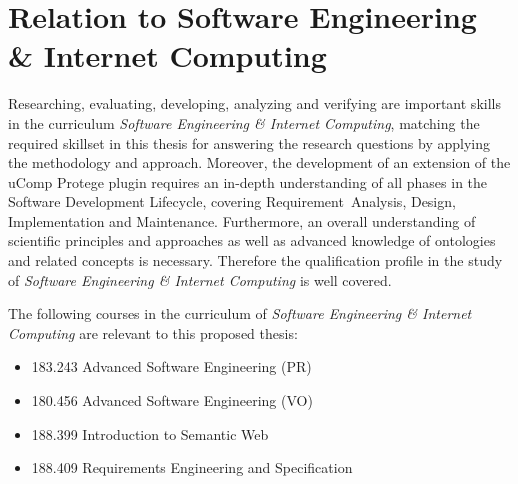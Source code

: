 \documentclass[12pt, notitlepage]{article}
\begin{document}
\section{Relation to Software Engineering \& Internet Computing}
Researching, evaluating, developing, analyzing and verifying are important skills in the curriculum \emph{Software Engineering \& Internet Computing}, matching the required skillset in this thesis for answering the research questions by applying the methodology and approach. Moreover, the development of an extension of the uComp Protege plugin requires an in-depth understanding of all phases in the Software Development Lifecycle, covering Requirement~Analysis, Design, Implementation and Maintenance. Furthermore, an overall understanding of scientific principles and approaches as well as advanced knowledge of ontologies and related concepts is necessary. Therefore the qualification profile in the study of \emph{Software Engineering \& Internet Computing} is well covered. 

The following courses in the curriculum of \emph{Software Engineering \& Internet Computing} are relevant to this proposed thesis:
\begin{itemize}
	\item 183.243 Advanced Software Engineering (PR)
	\item 180.456 Advanced Software Engineering (VO)
	\item 188.399 Introduction to Semantic Web
	\item 188.409 Requirements Engineering and Specification
\end{itemize}

\newpage


\end{document}
